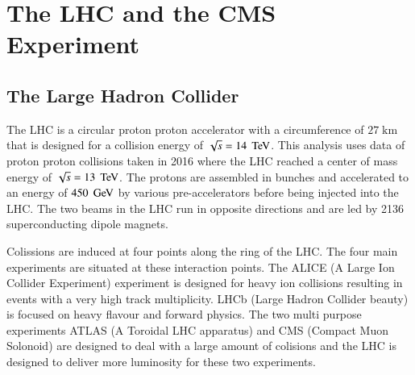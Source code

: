 
\chapter{The LHC and the CMS Experiment}

\section{The Large Hadron Collider}

The LHC \cite{1748-0221-3-08-S08001} is a circular proton proton accelerator with a circumference of $27 \; \mathrm{km}$ that is designed for a collision energy of $\sqrt{s} = 14 \; \,\text{Te\hspace{-.08em}V}$.
This analysis uses data of proton proton collisions taken in 2016 where the LHC reached a center of mass energy of $\sqrt{s}= 13 \; \,\text{Te\hspace{-.08em}V}$.
The protons are assembled in bunches and accelerated to an energy of  $450 \; \,\text{Ge\hspace{-.08em}V}$ by various pre-accelerators before being injected into the LHC.
The two beams in the LHC run in opposite directions and are led by 2136 superconducting dipole magnets.

Colissions are induced at four points along the ring of the LHC. The four main experiments are situated at these interaction points.
The ALICE (A Large Ion Collider Experiment) experiment is designed for heavy ion collisions resulting in events with a very high track multiplicity.
LHCb (Large Hadron Collider beauty) is focused on heavy flavour and forward physics.
The two multi purpose experiments ATLAS (A Toroidal LHC apparatus) and CMS (Compact Muon Solonoid) are designed to deal with a large amount of colisions and
the LHC is designed to deliver more luminosity for these two experiments.

